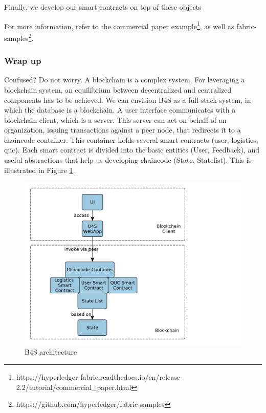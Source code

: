 \documentclass[12pt,a4paper]{article}
\theoremstyle{definition}
\begin{document}
Finally, we develop our smart contracts on top of these objects 


For more information, refer to the commercial paper example\footnote{https://hyperledger-fabric.readthedocs.io/en/release-2.2/tutorial/commercial\_paper.html}, as well as fabric-samples\footnote{https://github.com/hyperledger/fabric-samples}.



\subsubsection{Wrap up}
Confused? Do not worry. A blockchain is a complex system. For leveraging a blockchain system, an equilibrium between decentralized and centralized components has to be achieved. We can envision B4S as a full-stack system, in which the database is a blockchain. A user interface communicates with a blockchain client, which is a server. This server can act on behalf of an organization, issuing transactions against a peer node, that redirects it to a chaincode container. This container holds several smart contracts (user, logistics, quc). Each smart contract is divided into the basic entities (User, Feedback), and useful abstractions that help us developing chaincode (State, Statelist). This is illustrated in Figure \ref{fig:b4s}.

\begin{figure}[h]
    \centering
    \includegraphics[scale=0.6]{figures/b4s_architecture.pdf}
    \caption{B4S architecture}
    \label{fig:b4s}
\end{figure}
\end{document}
